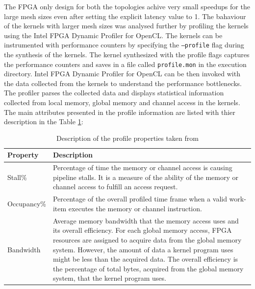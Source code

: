 The FPGA only design for both the topologies achive very small speedups for the large mesh sizes
even after setting the explicit latency value to 1. The bahaviour of the kernels with larger mesh
sizes was analysed further by profiling the kernels using the Intel FPGA Dynamic Profiler for OpenCL.
The kernels can be instrumented with performance counters by specifying the \texttt{--profile} flag
during the synthesis of the kernels. The kernel synthesized with the profile flags captures the
performance counters and saves in a file called \texttt{profile.mon} in the execution directory.
Intel FPGA Dynamic Profiler for OpenCL can be then invoked with the data collected from the
kernels to understand the performance bottlenecks. The profiler parses the collected data and
displays statistical information collected from local memory, global memory and channel
access in the kernels. The main attributes presented in the profile information are
listed with thier description in the Table \ref{tab:profile_descr}:
\begin{table}[ht]%
    \centering
    \caption{Description of the profile properties taken from \cite{noauthor_intel_2019_best}}
    \label{tab:profile_descr}
    \begin{tabular}{lp{11cm}}
    \textbf{Property} & \textbf{Description} \\
    \hline
    Stall\% & Percentage of time the memory or channel
    access is causing pipeline stalls. It is a measure of the ability
    of the memory or channel access to fulfill an access request. \\
    \hline
    Occupancy\% & Percentage of the overall profiled time frame
    when a valid work-item executes the memory or channel instruction. \\
    \hline
    Bandwidth & Average memory bandwidth that the memory access
    uses and its overall efficiency. For each global memory access,
    FPGA resources are assigned to acquire data from the global
    memory system. However, the amount of data a kernel program
    uses might be less than the acquired data. The overall
    efficiency is the percentage of total bytes, acquired
    from the global memory system, that the kernel program uses.\\
    \hline
    \end{tabular}%
\end{table}

